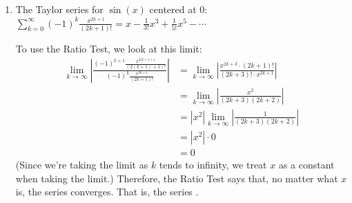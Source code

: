 \documentclass[main]{subfiles}
\begin{document}
\begin{enumerate}
\begin{enumerate}
    \begin{solution}
    The Ratio Test says we should look at
    \begin{align*}
    \lim_{k \to \infty} \left| \frac{\frac{x^{k+1}}{(k +
    1)!}}{\frac{x^k}{k!}} \right| 
    & = \lim_{k \to \infty} \left| \frac{x^{k+1}}{x^k} \cdot
    \frac{k!}{(k + 1)!} \right| \\
    & = \lim_{k \to \infty} \left| x \cdot \frac{1}{k + 1} \right|
    \\
    & = |x| \lim_{k \to \infty} \left| \frac{1}{k + 1} \right| \\
    & = |x| \cdot 0 \\
    & = 0
    \end{align*}
    Since the limit exists and is less than 1, the Ratio Test says that
    the series converges absolutely, no matter what $x$ is.  That is,
    the Taylor series . 
    
    Note that we still don't know if the Taylor series for $e^x$ is actually \textit{equal} to $e^x$. All we know is that the Taylor series for $e^x$ converges to \textit{something} for all $x$ values.
    \end{solution}

\item
\begin{problem}[\vfill]
The Taylor series for $\sin(x)$ centered at 0: $\displaystyle \sum_{k=0}^\infty (-1)^k
  \frac{x^{2k+1}}{(2k+1)!}= x-\frac{1}{3!}x^3+\frac{1}{5!}x^5-\cdots$ 
  \end{problem}


\begin{solution}
To use the Ratio Test, we look at this limit: 
  \begin{align*}
   \lim_{k \to \infty} \left| \frac{(-1)^{k + 1}
   \frac{x^{2(k+1+1}}{(2(k +1)+ 1)!}}{(-1)^k \frac{x^{2k+1}}{(2k+1)!}}
   \right|  
   & = \lim_{k \to \infty} \left| \frac{x^{2k + 3} \cdot (2k+1)!}{(2k +
   3)! \cdot x^{2k+1}} \right| \\ 
   & = \lim_{k \to \infty} \left| \frac{x^2}{(2k + 3)(2k + 2)}
   \right| \\
   & = \left| x^2 \right| \lim_{k \to \infty} \left| \frac{1}{(2k +
   3)(2k + 2)} \right| \\
   & = \left| x^2 \right| \cdot 0 \\
   & = 0
   \end{align*}
   (Since we're taking the limit as $k$ tends to infinity, we treat $x$
   as a constant when taking the limit.)  Therefore, the Ratio Test says
   that, no matter what $x$ is, the series converges.  That is, the
   series .
  

\end{solution}
\end{enumerate}
\end{enumerate}
\end{document}
